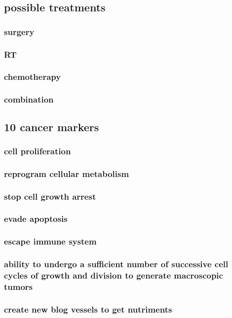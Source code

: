 \subsection{possible treatments}
\subsubsection{surgery}
\subsubsection{RT}
\subsubsection{chemotherapy}
\subsubsection{combination}

\subsection{10 cancer markers}
\subsubsection{cell proliferation}
\subsubsection{reprogram cellular metabolism}
\subsubsection{stop cell growth arrest}
\subsubsection{evade apoptosis}
\subsubsection{escape immune system}
\subsubsection{ability to undergo a sufficient number of successive cell cycles of growth and division to generate macroscopic tumors}
\subsubsection{create new blog vessels to get nutriments}

